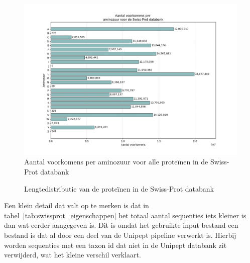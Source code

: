 \documentclass[11pt,dutch,faculty=we,layout=titlefont,underline=false,titleUppercase=true,titleUnderline=true]{ugent2016-report}
\begin{document}
    \begin{figure}[H]
        \centering
        \includegraphics[width=0.7\linewidth]{swissprot_aminozuur_voorkomens}
        \caption{Aantal voorkomens per aminozuur voor alle proteïnen in de Swiss-Prot databank}
        \label{fig:swissprot_aminozuur}
    \end{figure}

    \begin{figure}[H]
        \centering
        \caption{Lengtedistributie van de proteïnen in de Swiss-Prot databank}\label{fig:swissprot_length}
    \end{figure}

    Een klein detail dat valt op te merken is dat in tabel~\ref{tab:swissprot_eigenschappen} het totaal aantal sequenties iets kleiner is dan wat eerder aangegeven is.
    Dit is omdat het gebruikte input bestand een bestand is dat al door een deel van de Unipept pipeline verwerkt is.
    Hierbij worden sequenties met een taxon id dat niet in de Unipept databank zit verwijderd, wat het kleine verschil verklaart.
\end{document}
